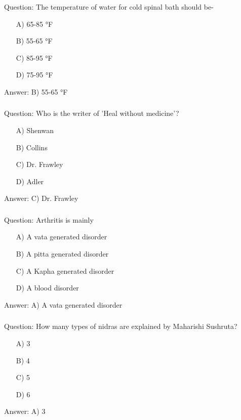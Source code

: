 \begin{frame}[fragile]\frametitle{}

Question: The temperature of water for cold spinal bath should be-

\begin{itemize}
\item[A)] 65-85 °F
\item[B)] 55-65 °F
\item[C)] 85-95 °F
\item[D)] 75-95 °F
\end{itemize}

Answer: B) 55-65 °F
\end{frame}

\begin{frame}[fragile]\frametitle{}

Question: Who is the writer of 'Heal without medicine'?

\begin{itemize}
\item[A)] Shenwan
\item[B)] Collins
\item[C)] Dr. Frawley
\item[D)] Adler
\end{itemize}

Answer: C) Dr. Frawley
\end{frame}

\begin{frame}[fragile]\frametitle{}

Question: Arthritis is mainly

\begin{itemize}
\item[A)] A vata generated disorder
\item[B)] A pitta generated disorder
\item[C)] A Kapha generated disorder
\item[D)] A blood disorder
\end{itemize}

Answer: A) A vata generated disorder
\end{frame}

\begin{frame}[fragile]\frametitle{}

Question: How many types of nidras are explained by Maharishi Sushruta?

\begin{itemize}
\item[A)] 3
\item[B)] 4
\item[C)] 5
\item[D)] 6
\end{itemize}

Answer: A) 3
\end{frame}

